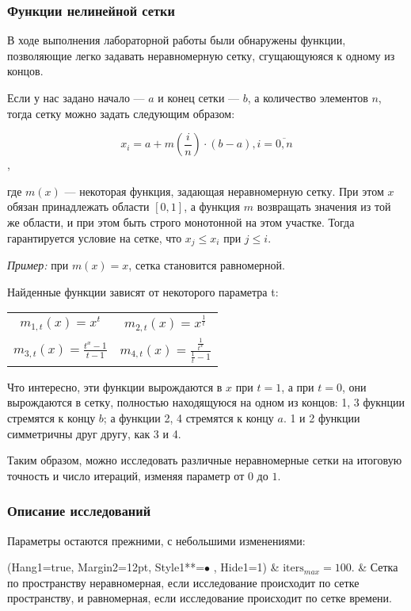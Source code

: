 \subsubsection{Функции нелинейной сетки}

В ходе выполнения лабораторной работы были обнаружены функции, позволяющие легко задавать неравномерную сетку, сгущающуюяся к одному из концов.

Если у нас задано начало --- $a$ и конец сетки --- $b$, а количество элементов $n$, тогда сетку можно задать следующим образом:

$$ x_i = a + m\left(\frac{i}{n}\right) \cdot (b-a), i=\overline{0, n} $$,

где $m(x)$ --- некоторая функция, задающая неравномерную сетку. При этом $x$ обязан принадлежать области $[0, 1]$, а функция $m$ возвращать значения из той же области, и при этом быть строго монотонной на этом участке. Тогда гарантируется условие на сетке, что $x_j \leqslant x_i$ при $j \leqslant i$. 

\textit{Пример:} при $m(x) = x$, сетка становится равномерной.

Найденные функции зависят от некоторого параметра t:

\begin{center}\begin{tabular}{cc}
$ m_{1, t}(x) = x^t $ & $ m_{2, t}(x) = x^\frac{1}{t} $ \\
$ m_{3, t}(x) = \frac{t^x-1}{t-1} $ & $ m_{4, t}(x) = \frac{\frac{1}{t^x}}{\frac{1}{t}-1} $
\end{tabular}\end{center}

Что интересно, эти функции вырождаются в $x$ при $t=1$, а при $t=0$, они вырождаются в сетку, полностью находящуюся на одном из концов: 1, 3 фукнции стремятся к концу $b$; а функции 2, 4 стремятся к концу $a$. 1 и 2 функции симметричны друг другу, как 3 и 4.

Таким образом, можно исследовать различные неравномерные сетки на итоговую точность и число итераций, изменяя параметр от $0$ до $1$.

\subsubsection{Описание исследований}

Параметры остаются прежними, с небольшими изменениями:

\begin{easylist}
\ListProperties(Hang1=true, Margin2=12pt, Style1**=$\bullet$ , Hide1=1)
& $\mathrm{iters}_{max} = 100$.
& Сетка по пространству неравномерная, если исследование происходит по сетке пространству, и равномерная, если исследование происходит по сетке времени.
\end{easylist}

